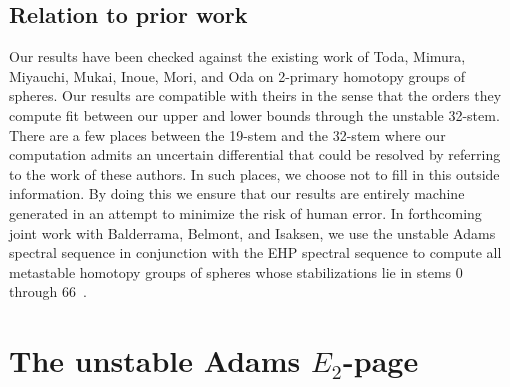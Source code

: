 \documentclass[dvipsnames,table]{amsart}
\theoremstyle{definition}
\theoremstyle{remark}
\numberwithin{equation}{section}
\begin{document}
\subsection{Relation to prior work}
Our results have been checked against the existing work of Toda, Mimura, Miyauchi, Mukai, Inoue, Mori, and Oda on 2-primary homotopy groups of spheres. Our results are compatible with theirs in the sense that the orders they compute fit between our upper and lower bounds through the unstable 32-stem. There are a few places between the 19-stem and the 32-stem where our computation admits an uncertain differential that could be resolved by referring to the work of these authors. In such places, we choose not to fill in this outside information. By doing this we ensure that our results are entirely machine generated in an attempt to minimize the risk of human error.
In forthcoming joint work with Balderrama, Belmont, and Isaksen, we use the unstable Adams spectral sequence in conjunction with the EHP spectral sequence to compute all metastable homotopy groups of spheres whose stabilizations lie in stems 0 through 66~\cite{BBBI_metastable}.
\section{The unstable Adams \texorpdfstring{$E_2$}{E2}-page}
\label{sec:lambda}
\end{document}
